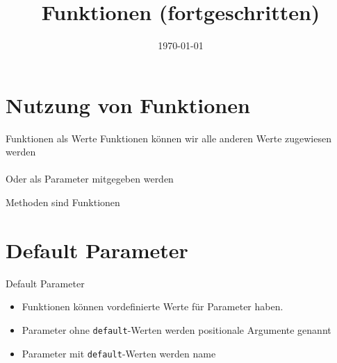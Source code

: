 	


\newcommand{\topic}{
	Funktionen (fortgeschritten)
}

\title{\topic}
\supertitle{\course}
\date{\today}



\maketitle

\begin{frame}
	\tableofcontents
\end{frame}


\section{Nutzung von Funktionen}
\begin{frame}[fragile]{Funktionen als Werte}
Funktionen k\"onnen wir alle anderen Werte zugewiesen werden\\


\ \\[.25cm]
Oder als Parameter mitgegeben werden\\


\end{frame}

\begin{frame}[fragile]{Methoden sind Funktionen}

\end{frame}

\section{Default Parameter}
\begin{frame}[fragile]{Default Parameter}
\begin{itemize}
	\item Funktionen k\"onnen vordefinierte Werte für Parameter haben.
	\item Parameter ohne \texttt{default}-Werten werden positionale Argumente genannt
	\item Parameter mit \texttt{default}-Werten werden name
\end{itemize}

\end{frame}


